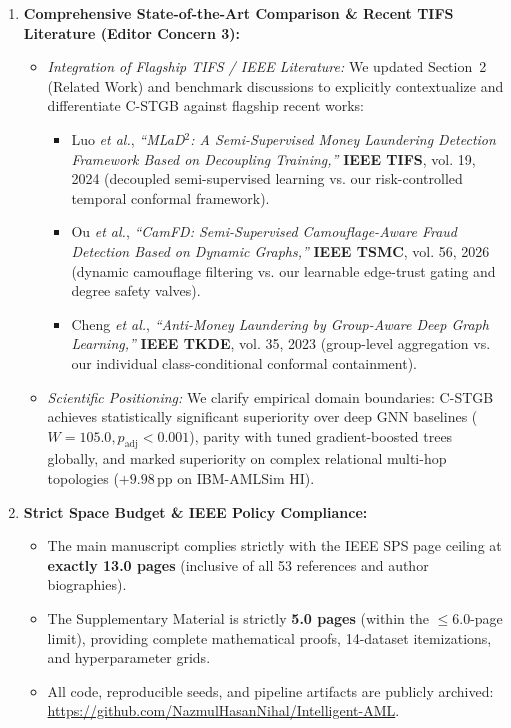 \documentclass[9.5pt,a4paper]{article}
\begin{document}
\begin{enumerate}[label=\textbf{\arabic*.}]
    \item \textbf{Comprehensive State-of-the-Art Comparison \& Recent TIFS Literature (Editor Concern 3):}
    \begin{itemize}
        \item \textit{Integration of Flagship TIFS / IEEE Literature:} We updated Section~2 (Related Work) and benchmark discussions to explicitly contextualize and differentiate C-STGB against flagship recent works:
        \begin{itemize}
            \item Luo \textit{et al.}, \textit{``MLaD$^2$: A Semi-Supervised Money Laundering Detection Framework Based on Decoupling Training,''} \textbf{IEEE TIFS}, vol. 19, 2024 (decoupled semi-supervised learning vs. our risk-controlled temporal conformal framework).
            \item Ou \textit{et al.}, \textit{``CamFD: Semi-Supervised Camouflage-Aware Fraud Detection Based on Dynamic Graphs,''} \textbf{IEEE TSMC}, vol. 56, 2026 (dynamic camouflage filtering vs. our learnable edge-trust gating and degree safety valves).
            \item Cheng \textit{et al.}, \textit{``Anti-Money Laundering by Group-Aware Deep Graph Learning,''} \textbf{IEEE TKDE}, vol. 35, 2023 (group-level aggregation vs. our individual class-conditional conformal containment).
        \end{itemize}
        \item \textit{Scientific Positioning:} We clarify empirical domain boundaries: C-STGB achieves statistically significant superiority over deep GNN baselines ($W=105.0, p_{\text{adj}} < 0.001$), parity with tuned gradient-boosted trees globally, and marked superiority on complex relational multi-hop topologies ($+9.98$\,pp on IBM-AMLSim HI).
    \end{itemize}

    \item \textbf{Strict Space Budget \& IEEE Policy Compliance:}
    \begin{itemize}
        \item The main manuscript complies strictly with the IEEE SPS page ceiling at \textbf{exactly 13.0 pages} (inclusive of all 53 references and author biographies).
        \item The Supplementary Material is strictly \textbf{5.0 pages} (within the $\le 6.0$-page limit), providing complete mathematical proofs, 14-dataset itemizations, and hyperparameter grids.
        \item All code, reproducible seeds, and pipeline artifacts are publicly archived: \url{https://github.com/NazmulHasanNihal/Intelligent-AML}.
    \end{itemize}
\end{enumerate}
\end{document}
